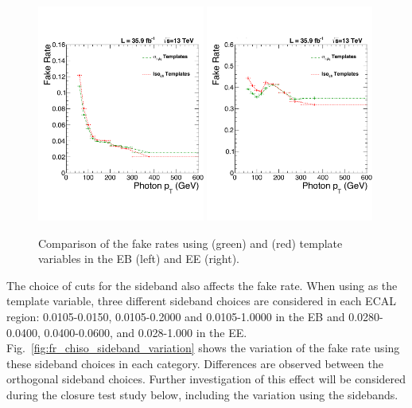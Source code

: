 \begin{figure}[!htbp]
  \centering
  \includegraphics[width=0.49\textwidth]{figures/sieieChIsoCompEB.pdf}
  \includegraphics[width=0.49\textwidth]{figures/sieieChIsoCompEE.pdf}
  \caption{Comparison of the fake rates using \sieie (green) and \chiso (red) template variables in the EB (left) and EE (right).}
  \label{fig:fr_template_comparison}
\end{figure}

The choice of cuts for the sideband also affects the fake rate. When using \chiso as the template variable, three different \sieie sideband choices are considered in each ECAL region: 0.0105-0.0150, 0.0105-0.2000 and 0.0105-1.0000 in the EB and 0.0280-0.0400, 0.0400-0.0600, and 0.028-1.000 in the EE. Fig.~\ref{fig:fr_chiso_sideband_variation} shows the variation of the fake rate using these sideband choices in each category. Differences are observed between the orthogonal sideband choices. Further investigation of this effect will be considered during the closure test study below, including the variation using the \chiso sidebands.


